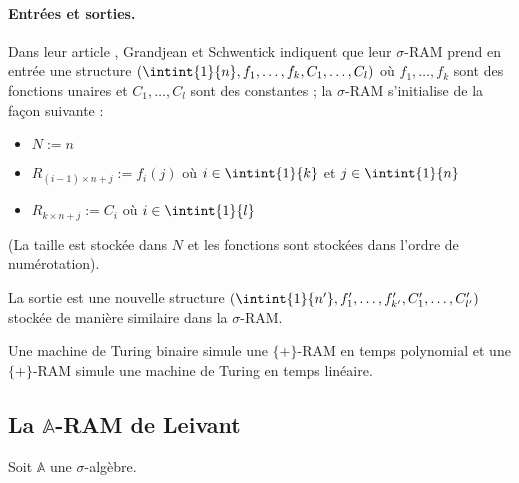 \documentclass{report}
\newcommand{\bbA}{\mathbb{A}}
\begin{document}
		
			\paragraph{Entrées et sorties.}
			Dans leur article \cite{GrandjeanSchwentick2002}, Grandjean et Schwentick indiquent que leur $\sigma$-RAM prend en entrée une structure $\left( \intint{1}{n},  f_1, \dots, f_k, C_1, \dots, C_l \right)$ où $f_1, \dots, f_k$ sont des fonctions unaires et $C_1, \dots, C_l$ sont des constantes ; la $\sigma$-RAM s'initialise de la façon suivante : 
			
			\begin{itemize}[itemsep=-1mm]
				\item 	$N := n$
				\item 	$R_{(i-1) \times n + j} := f_i(j)$ où $i \in \intint{1}{k}$ et $j \in \intint{1}{n}$
				\item 	$R_{k \times n + j} := C_i$ où $i \in \intint{1}{l}$
			\end{itemize}
			(La taille est stockée dans $N$ et les fonctions sont stockées dans l'ordre de numérotation).
			
			La sortie est une nouvelle structure $\left( \intint{1}{n'}, f'_1, \dots, f'_{k'}, C'_1, \dots, C'_{l'}\right)$ stockée de manière similaire dans la $\sigma$-RAM. 
		
		
		\begin{theorem}
			\label{thm:sRAMs_turing_complete}
			Une machine de Turing binaire simule une $\{+\}$-RAM en temps polynomial et une $\{+\}$-RAM simule une machine de Turing en temps linéaire.
		\end{theorem}
		
		
		
		
		\subsection{La $\bbA$-RAM de Leivant}
		\label{subsec:A_RAM_de_Leivant}
		
		Soit $\bbA$ une $\sigma$-algèbre. 
		
\end{document}
